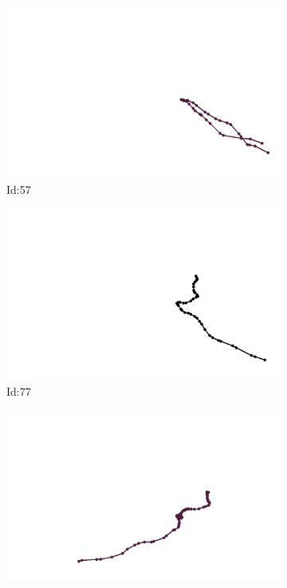 \documentclass[12pt,twoside]{report}
\begin{document}
\begin{figure}
\centering
\begin{subfigure}[b]{0.20\textwidth}
\centering
\includegraphics[width=\textwidth]{../trajectories/57.png}
\caption{Id:57}
\end{subfigure}
\begin{subfigure}[b]{0.20\textwidth}
\centering
\includegraphics[width=\textwidth]{../trajectories/77.png}
\caption{Id:77}
\end{subfigure}
\begin{subfigure}[b]{0.20\textwidth}
\centering
\includegraphics[width=\textwidth]{../trajectories/92.png}

\end{subfigure}
\end{figure}
\end{document}

